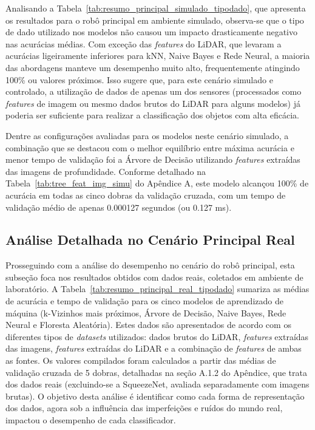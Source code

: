 Analisando a Tabela~\ref{tab:resumo_principal_simulado_tipodado}, que apresenta os resultados para o robô principal em ambiente simulado, observa-se que o tipo de dado utilizado nos modelos não causou um impacto drasticamente negativo nas acurácias médias. Com exceção das \textit{features} do LiDAR, que levaram a acurácias ligeiramente inferiores para kNN, Naive Bayes e Rede Neural, a maioria das abordagens manteve um desempenho muito alto, frequentemente atingindo 100\% ou valores próximos. Isso sugere que, para este cenário simulado e controlado, a utilização de dados de apenas um dos sensores (processados como \textit{features} de imagem ou mesmo dados brutos do LiDAR para alguns modelos) já poderia ser suficiente para realizar a classificação dos objetos com alta eficácia.

Dentre as configurações avaliadas para os modelos neste cenário simulado, a combinação que se destacou com o melhor equilíbrio entre máxima acurácia e menor tempo de validação foi a Árvore de Decisão utilizando \textit{features} extraídas das imagens de profundidade. Conforme detalhado na Tabela~\ref{tab:tree_feat_img_simu} do Apêndice A, este modelo alcançou 100\% de acurácia em todas as cinco dobras da validação cruzada, com um tempo de validação médio de apenas 0.000127 segundos (ou 0.127 ms).

\subsection{Análise Detalhada no Cenário Principal Real}

Prosseguindo com a análise do desempenho no cenário do robô principal, esta subseção foca nos resultados obtidos com dados reais, coletados em ambiente de laboratório. A Tabela~\ref{tab:resumo_principal_real_tipodado} sumariza as médias de acurácia e tempo de validação para os cinco modelos de aprendizado de máquina (k-Vizinhos mais próximos, Árvore de Decisão, Naive Bayes, Rede Neural e Floresta Aleatória). Estes dados são apresentados de acordo com os diferentes tipos de \textit{datasets} utilizados: dados brutos do LiDAR, \textit{features} extraídas das imagens, \textit{features} extraídas do LiDAR e a combinação de \textit{features} de ambas as fontes. Os valores compilados foram calculados a partir das médias de validação cruzada de 5 dobras, detalhadas na seção A.1.2 do Apêndice, que trata dos dados reais (excluindo-se a SqueezeNet, avaliada separadamente com imagens brutas). O objetivo desta análise é identificar como cada forma de representação dos dados, agora sob a influência das imperfeições e ruídos do mundo real, impactou o desempenho de cada classificador.

